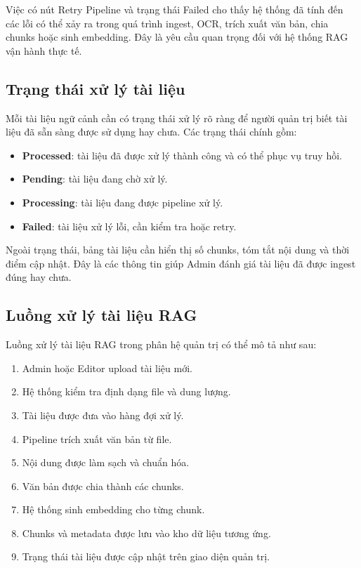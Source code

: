 \documentclass[12pt,a4paper]{report}
\begin{document}
Việc có nút Retry Pipeline và trạng thái Failed cho thấy hệ thống đã tính đến các lỗi có thể xảy ra trong quá trình ingest, OCR, trích xuất văn bản, chia chunks hoặc sinh embedding. Đây là yêu cầu quan trọng đối với hệ thống RAG vận hành thực tế.

\subsection{Trạng thái xử lý tài liệu}

Mỗi tài liệu ngữ cảnh cần có trạng thái xử lý rõ ràng để người quản trị biết tài liệu đã sẵn sàng được sử dụng hay chưa. Các trạng thái chính gồm:

\begin{itemize}
    \item \textbf{Processed}: tài liệu đã được xử lý thành công và có thể phục vụ truy hồi.
    \item \textbf{Pending}: tài liệu đang chờ xử lý.
    \item \textbf{Processing}: tài liệu đang được pipeline xử lý.
    \item \textbf{Failed}: tài liệu xử lý lỗi, cần kiểm tra hoặc retry.
\end{itemize}

Ngoài trạng thái, bảng tài liệu cần hiển thị số chunks, tóm tắt nội dung và thời điểm cập nhật. Đây là các thông tin giúp Admin đánh giá tài liệu đã được ingest đúng hay chưa.

\subsection{Luồng xử lý tài liệu RAG}

Luồng xử lý tài liệu RAG trong phân hệ quản trị có thể mô tả như sau:

\begin{enumerate}
    \item Admin hoặc Editor upload tài liệu mới.
    \item Hệ thống kiểm tra định dạng file và dung lượng.
    \item Tài liệu được đưa vào hàng đợi xử lý.
    \item Pipeline trích xuất văn bản từ file.
    \item Nội dung được làm sạch và chuẩn hóa.
    \item Văn bản được chia thành các chunks.
    \item Hệ thống sinh embedding cho từng chunk.
    \item Chunks và metadata được lưu vào kho dữ liệu tương ứng.
    \item Trạng thái tài liệu được cập nhật trên giao diện quản trị.
\end{enumerate}
\end{document}
